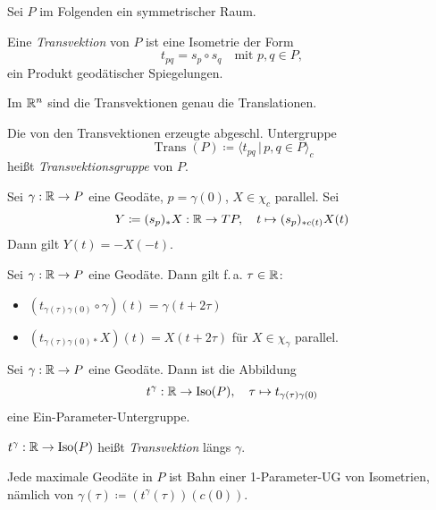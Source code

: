 \documentclass{cheat-sheet}
\DeclareMathOperator{\Iso}{Iso} %
\DeclareMathOperator{\Trans}{Trans} %
\begin{document}
\begin{nota}
  Sei $P$ im Folgenden ein symmetrischer Raum.
\end{nota}

\begin{defn}
  Eine \emph{Transvektion} von $P$ ist eine Isometrie der Form
  \[ t_{pq} = s_p \circ s_q \quad \text{mit } p, q \in P, \]
  \dh{} ein Produkt geodätischer Spiegelungen.
\end{defn}

\begin{bsp}
  Im $\mathbb{R}^n$ sind die Transvektionen genau die Translationen.
\end{bsp}

\begin{defn}
  Die von den Transvektionen erzeugte abgeschl. Untergruppe
  \[ \Trans(P) \coloneqq \langle t_{pq} \,|\, p, q \in P \rangle_{c} \]
  heißt \emph{Transvektionsgruppe} von $P$.
\end{defn}

\begin{lem}
  Sei $\gamma : \mathbb{R} \to P$ eine Geodäte, $p = \gamma(0)$, $X \in \chi_c$ parallel. Sei
  \[
    Y \coloneqq (s_p)_* X : \mathbb{R} \to TP, \quad
    t \mapsto (s_p)_{*c(t)} X(t)
  \]
  Dann gilt $Y(t) = -X(-t)$.
\end{lem}

\begin{lem}
  Sei $\gamma : \mathbb{R} \to P$ eine Geodäte. Dann gilt f.\,a. $\tau \in \mathbb{R}$:
  \begin{itemize}
    \item $(t_{\gamma(\tau)\gamma(0)} \circ \gamma)(t) = \gamma(t + 2\tau)$
    \item $(t_{\gamma(\tau)\gamma(0)*} X)(t) = X(t + 2 \tau)$ für $X \in \chi_\gamma$ parallel.
  \end{itemize}
\end{lem}

\begin{lem}
  Sei $\gamma : \mathbb{R} \to P$ eine Geodäte. Dann ist die Abbildung
  \[
    t^\gamma : \R \to \Iso(P), \quad
    \tau \mapsto t_{\gamma(\tau)\gamma(0)}
  \]
  eine Ein-Parameter-Untergruppe.
\end{lem}

\begin{defn}
  $t^\gamma : \R \to \Iso(P)$ heißt \emph{Transvektion} längs $\gamma$.
\end{defn}

\begin{satz}
  Jede maximale Geodäte in $P$ ist Bahn einer 1-Parameter-UG von Isometrien, nämlich von $\gamma(\tau) \coloneqq (t^\gamma(\tau))(c(0))$.
\end{satz}
\end{document}
